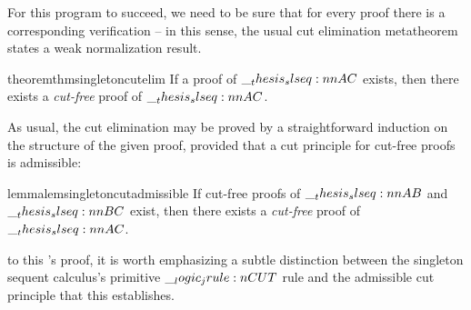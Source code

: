 %
%
%
%
For this program to succeed, we need to be sure that for every proof there is a corresponding verification -- 
%
in this sense, the usual cut elimination metatheorem states a weak normalization result.
%
\begin{restatable*}[
  name=Cut elimination,
  label=thm:singleton-logic:seq-calc:cut-elimination
]{theorem}{thmsingletoncutelim}
  If a proof of $\slseq{A |- C}$ exists, then there exists a \emph{cut-free} proof of $\slseq{A |- C}$.
\end{restatable*}
%
As usual, the cut elimination  may be proved by a straightforward induction on the structure of the given proof, provided that a cut principle for cut-free proofs is admissible:
% 
\begin{restatable*}[
  name=Admissibility of cut,
  label=lem:singleton-logic:cut-admissibility
]{lemma}{lemsingletoncutadmissible}
  If cut-free proofs of $\slseq{A |- B}$ and $\slseq{B |- C}$ exist, then there exists a \emph{cut-free} proof of $\slseq{A |- C}$.
\end{restatable*}

 to this 's proof, it is worth emphasizing a subtle distinction between the singleton sequent calculus's primitive $\__logic_jrule:n {CUT}$ rule and the admissible cut principle that this  establishes.

